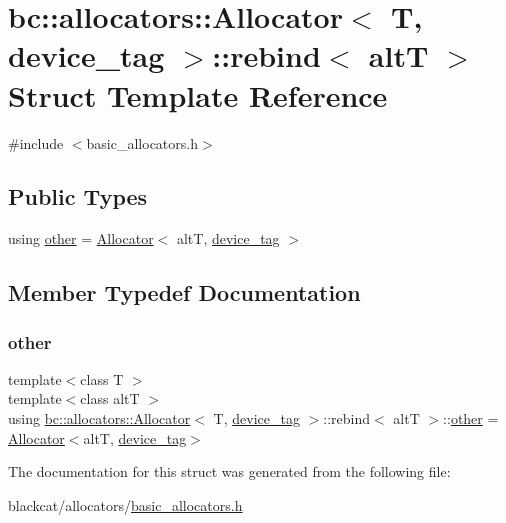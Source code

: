 \hypertarget{structbc_1_1allocators_1_1Allocator_3_01T_00_01device__tag_01_4_1_1rebind}{}\section{bc\+:\+:allocators\+:\+:Allocator$<$ T, device\+\_\+tag $>$\+:\+:rebind$<$ altT $>$ Struct Template Reference}
\label{structbc_1_1allocators_1_1Allocator_3_01T_00_01device__tag_01_4_1_1rebind}


{\ttfamily \#include $<$basic\+\_\+allocators.\+h$>$}

\subsection*{Public Types}
\begin{DoxyCompactItemize}
\item 
using \hyperlink{structbc_1_1allocators_1_1Allocator_3_01T_00_01device__tag_01_4_1_1rebind_a0cbcc5e4348ba1bb4b50c95c3d700ae9}{other} = \hyperlink{classbc_1_1allocators_1_1Allocator}{Allocator}$<$ altT, \hyperlink{structbc_1_1device__tag}{device\+\_\+tag} $>$
\end{DoxyCompactItemize}


\subsection{Member Typedef Documentation}
\mbox{\label{structbc_1_1allocators_1_1Allocator_3_01T_00_01device__tag_01_4_1_1rebind_a0cbcc5e4348ba1bb4b50c95c3d700ae9}} 
\subsubsection{\texorpdfstring{other}{other}}
{\footnotesize\ttfamily template$<$class T $>$ \\
template$<$class altT $>$ \\
using \hyperlink{classbc_1_1allocators_1_1Allocator}{bc\+::allocators\+::\+Allocator}$<$ T, \hyperlink{structbc_1_1device__tag}{device\+\_\+tag} $>$\+::rebind$<$ altT $>$\+::\hyperlink{structbc_1_1allocators_1_1Allocator_3_01T_00_01device__tag_01_4_1_1rebind_a0cbcc5e4348ba1bb4b50c95c3d700ae9}{other} =  \hyperlink{classbc_1_1allocators_1_1Allocator}{Allocator}$<$altT, \hyperlink{structbc_1_1device__tag}{device\+\_\+tag}$>$}



The documentation for this struct was generated from the following file\+:\begin{DoxyCompactItemize}
\item 
blackcat/allocators/\hyperlink{basic__allocators_8h}{basic\+\_\+allocators.\+h}\end{DoxyCompactItemize}
